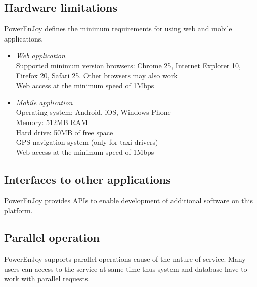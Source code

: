\subsection{Hardware limitations}
PowerEnJoy defines the minimum requirements for using web and mobile applications.
\begin{itemize}
	\item \textit{Web application}\\
	Supported minimum version browsers: Chrome 25, Internet Explorer 10, Firefox 20, Safari 25. Other browsers may also work\\
	Web access at the minimum speed of 1Mbps
	\item \textit{Mobile application}\\
	Operating system: Android, iOS, Windows Phone\\
	Memory: 512MB RAM\\
	Hard drive: 50MB of free space\\
	GPS navigation system (only for taxi drivers)\\
	Web access at the minimum speed of 1Mbps
\end{itemize}

\subsection{Interfaces to other applications}
PowerEnJoy provides APIs to enable development of additional software on this platform.

\subsection{Parallel operation}
PowerEnJoy supports parallel operations cause of the nature of service. Many users can access to the service at same time thus system and database have to work with parallel requests.


